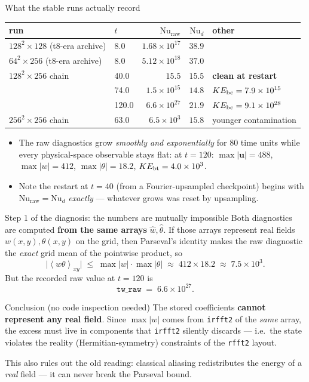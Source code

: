 \documentclass[aspectratio=169,10pt]{beamer}
\newcommand{\avexy}[1]{\left\langle #1 \right\rangle_{xy}}
\newcommand{\Nud}{\mathrm{Nu}_{d}}
\newcommand{\Nuraw}{\mathrm{Nu}_{\mathrm{raw}}}
\begin{document}
\begin{frame}{What the stable runs actually record}
  \begin{center}
  \small
  \begin{tabular}{@{}llrrl@{}}
    \toprule
    run & $t$ & $\Nuraw$ & $\Nud$ & other \\
    \midrule
    $128^2{\times}128$ (t8-era archive) & 8.0 & $1.68\times10^{17}$ & $38.9$ & \\
    $64^2{\times}256$ (t8-era archive) & 8.0 & $5.12\times10^{18}$ & $37.0$ & \\
    \midrule
    $128^2{\times}256$ chain & 40.0 & $15.5$ & $15.5$ & \textbf{clean at restart} \\
     & 74.0 & $1.5\times10^{15}$ & $14.8$ & $KE_{\rm bc}=7.9\times10^{15}$ \\
     & 120.0 & $6.6\times10^{27}$ & $21.9$ & $KE_{\rm bc}=9.1\times10^{28}$ \\
    \midrule
    $256^2{\times}256$ chain & 63.0 & $6.5\times10^{3}$ & $15.8$ & younger contamination \\
    \bottomrule
  \end{tabular}
  \end{center}
  \begin{itemize}
    \item The raw diagnostics grow \emph{smoothly and exponentially} for 80 time units
      while every physical-space observable stays flat:
      at $t{=}120$: $\max|\mathbf{u}| = 488$, $\max|w| = 412$, $\max|\theta| = 18.2$,
      $KE_{\rm bt} = 4.0\times10^{3}$.
    \item Note the restart at $t{=}40$ (from a Fourier-upsampled checkpoint) begins
      with $\Nuraw = \Nud$ \emph{exactly} --- whatever grows was reset by upsampling.
  \end{itemize}
\end{frame}

\begin{frame}{Step 1 of the diagnosis: the numbers are mutually impossible}
  Both diagnostics are computed \textbf{from the same arrays} $\hat w,\hat\theta$.
  If those arrays represent real fields $w(x,y),\theta(x,y)$ on the grid, then
  Parseval's identity makes the raw diagnostic the \emph{exact} grid mean of the
  pointwise product, so
  \[
    \bigl|\avexy{w\theta}\bigr| \;\le\; \max|w|\cdot\max|\theta|
    \;\approx\; 412 \times 18.2 \;\approx\; 7.5\times10^{3}.
  \]
  But the recorded raw value at $t{=}120$ is
  \[
    \texttt{tw\_raw} \;=\; 6.6\times10^{27}.
  \]
  \begin{alertblock}{Conclusion (no code inspection needed)}
    The stored coefficients \textbf{cannot represent any real field}. Since
    $\max|w|$ comes from \texttt{irfft2} of the \emph{same} array, the excess must
    live in components that \texttt{irfft2} silently discards --- i.e.\ the state
    violates the reality (Hermitian-symmetry) constraints of the \texttt{rfft2}
    layout.
  \end{alertblock}
  This also rules out the old reading: classical aliasing redistributes the energy
  of a \emph{real} field --- it can never break the Parseval bound.
\end{frame}
\end{document}
